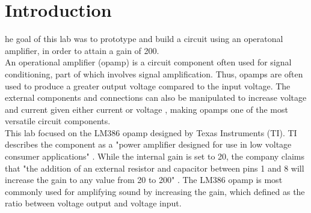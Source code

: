 \documentclass[journal]{IEEEtran}
\begin{document}




\section{Introduction}

\lowercase{he} goal of this lab was to prototype and build a circuit using an operatonal amplifier, in order to attain a gain of 200.\\ 


\noindent An operational amplifier (opamp) is a circuit component often used for signal conditioning, part of which involves signal amplification. Thus, opamps are often used to produce a greater output voltage compared to the input voltage. The external components and connections can also be manipulated to increase voltage and current given either current or voltage \cite{basicOpAmp}, making opamps one of the most versatile circuit components.\\

\noindent This lab focused on the LM386 opamp designed by Texas Instruments (TI). TI describes the component as a "power amplifier designed for use in low voltage consumer applications" \cite{tidata}. While the internal gain is set to 20, the company claims that "the addition of an external resistor and capacitor between pins 1 and 8 will increase the gain to any value from 20 to 200" \cite{tidata}. The LM386 opamp is most commonly used for amplifying sound by increasing the gain, which defined as the ratio between voltage output and voltage input.
\end{document}
